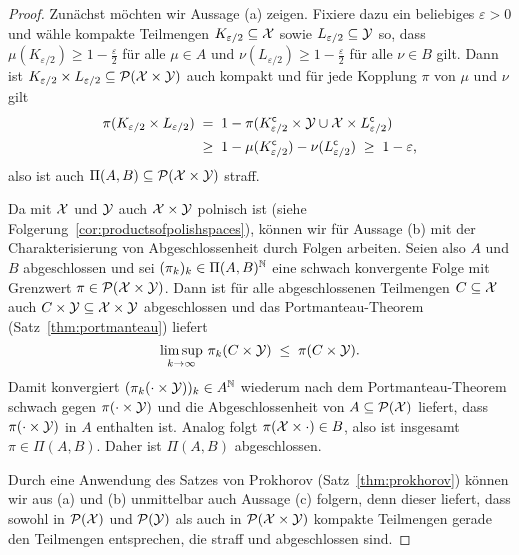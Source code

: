 \documentclass[../main/main.tex]{subfiles}
\begin{document}
	\begin{proof}
		Zunächst möchten wir Aussage (a) zeigen. Fixiere dazu ein beliebiges $\varepsilon > 0 $ und wähle kompakte Teilmengen $K_{\varepsilon/2} \subseteq \mathcal{X}$ sowie $L_{\varepsilon/2} \subseteq \mathcal{Y}$ so, dass $\mu(K_{\varepsilon/2}) \geq 1 - \frac{\varepsilon}{2}$ 
		für alle $\mu \in A$ und $\nu(L_{\varepsilon/2}) \geq 1 - \frac{\varepsilon}{2}$ für alle $\nu \in B$ gilt. Dann ist $K_{\varepsilon/2} \times L_{\varepsilon/2} \subseteq \mathcal{P}(\mathcal{X} \times \mathcal{Y})$ auch kompakt und für jede Kopplung $\pi$ von $\mu$ und $\nu$ gilt
		\begin{align*}
			\pi(K_{\varepsilon/2} \times L_{\varepsilon/2}) \; &= \; 1 - \pi(K_{\varepsilon/2}^\mathsf{c} \times \mathcal{Y} \cup \mathcal{X} \times L_{\varepsilon/2}^\mathsf{c}) \\
			&\geq \; 1 - \mu(K_{\varepsilon/2}^\mathsf{c}) - \nu(L_{\varepsilon/2}^\mathsf{c}) \; \geq \; 1 - \varepsilon \text{,}
		\end{align*}
		also ist auch $\Pi(A, B) \subseteq \mathcal{P}(\mathcal{X} \times \mathcal{Y})$ straff.
		
		Da mit $\mathcal{X}$ und $\mathcal{Y}$ auch $\mathcal{X} \times \mathcal{Y}$ polnisch ist (siehe Folgerung~\ref{cor:productsofpolishspaces}), können wir für Aussage (b) mit der Charakterisierung von Abgeschlossenheit durch Folgen arbeiten.
		Seien also $A$ und $B$ abgeschlossen und sei $(\pi_k)_k \in \Pi(A, B)^{\mathbb{N}}$ eine schwach konvergente Folge mit Grenzwert $\pi \in \mathcal{P}(\mathcal{X} \times \mathcal{Y})$.
		Dann ist für alle abgeschlossenen Teilmengen $C \subseteq \mathcal{X}$ auch $C \times \mathcal{Y} \subseteq \mathcal{X} \times \mathcal{Y}$ abgeschlossen und das Portmanteau-Theorem (Satz~\ref{thm:portmanteau}) liefert
		\[ \limsup_{k \to \infty} \, \pi_k(C \times \mathcal{Y}) \; \leq \; \pi(C \times \mathcal{Y}) \text{.} \]
		Damit konvergiert $(\pi_k(\cdot \times \mathcal{Y}))_k \in A^{\mathbb{N}}$ wiederum nach dem Portmanteau-Theorem schwach gegen $\pi(\cdot \times \mathcal{Y})$ und die Abgeschlossenheit 
		von $A \subseteq \mathcal{P}(\mathcal{X})$ liefert, dass $\pi(\cdot \times \mathcal{Y})$ in $A$
		enthalten ist. Analog folgt $\pi(\mathcal{X} \times \cdot) \in B$, also ist insgesamt $\pi \in \Pi(A, B)$. Daher ist $\Pi(A, B)$ abgeschlossen.
		
		Durch eine Anwendung des Satzes von Prokhorov (Satz~\ref{thm:prokhorov}) können wir aus (a) und (b) unmittelbar auch Aussage (c) folgern, denn dieser liefert, dass sowohl in $\mathcal{P}(\mathcal{X})$ und $\mathcal{P}(\mathcal{Y})$ als auch in $\mathcal{P}(\mathcal{X} \times \mathcal{Y})$ kompakte Teilmengen gerade den Teilmengen entsprechen, die straff und abgeschlossen sind.
	\end{proof}
\end{document}
